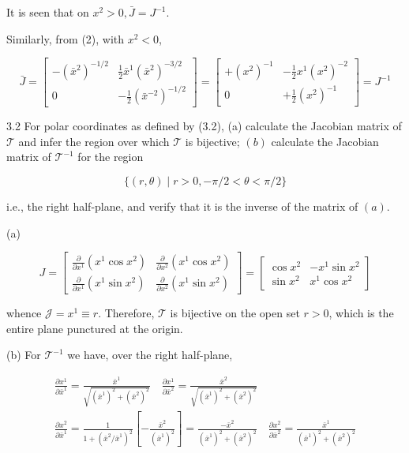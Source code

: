 \documentclass[10pt]{article}
\begin{document}
It is seen that on $x^{2}>0, \bar{J}=J^{-1}$.

Similarly, from (2), with $x^{2}<0$,

$$
\bar{J}=\left[\begin{array}{cc}
-\left(\bar{x}^{2}\right)^{-1 / 2} & \frac{1}{2} \bar{x}^{1}\left(\bar{x}^{2}\right)^{-3 / 2} \\
0 & -\frac{1}{2}\left(\bar{x}^{-2}\right)^{-1 / 2}
\end{array}\right]=\left[\begin{array}{cc}
+\left(x^{2}\right)^{-1} & -\frac{1}{2} x^{1}\left(x^{2}\right)^{-2} \\
0 & +\frac{1}{2}\left(x^{2}\right)^{-1}
\end{array}\right]=J^{-1}
$$

3.2 For polar coordinates as defined by (3.2), (a) calculate the Jacobian matrix of $\mathscr{T}$ and infer the region over which $\mathscr{T}$ is bijective; $(b)$ calculate the Jacobian matrix of $\mathscr{T}^{-1}$ for the region

$$
\{(r, \theta) \mid r>0,-\pi / 2<\theta<\pi / 2\}
$$

i.e., the right half-plane, and verify that it is the inverse of the matrix of $(a)$.

(a)

$$
J=\left[\begin{array}{cc}
\frac{\partial}{\partial x^{1}}\left(x^{1} \cos x^{2}\right) & \frac{\partial}{\partial x^{2}}\left(x^{1} \cos x^{2}\right) \\
\frac{\partial}{\partial x^{1}}\left(x^{1} \sin x^{2}\right) & \frac{\partial}{\partial x^{2}}\left(x^{1} \sin x^{2}\right)
\end{array}\right]=\left[\begin{array}{ll}
\cos x^{2} & -x^{1} \sin x^{2} \\
\sin x^{2} & x^{1} \cos x^{2}
\end{array}\right]
$$

whence $\mathscr{J}=x^{1} \equiv r$. Therefore, $\mathscr{T}$ is bijective on the open set $r>0$, which is the entire plane punctured at the origin.

(b) For $\mathscr{T}^{-1}$ we have, over the right half-plane,

$$
\begin{gathered}
\frac{\partial x^{1}}{\partial \bar{x}^{1}}=\frac{\bar{x}^{1}}{\sqrt{\left(\bar{x}^{1}\right)^{2}+\left(\bar{x}^{2}\right)^{2}}} \quad \frac{\partial x^{1}}{\partial \bar{x}^{2}}=\frac{\bar{x}^{2}}{\sqrt{\left(\bar{x}^{1}\right)^{2}+\left(\bar{x}^{2}\right)^{2}}} \\
\frac{\partial x^{2}}{\partial \bar{x}^{1}}=\frac{1}{1+\left(\bar{x}^{2} / \bar{x}^{1}\right)^{2}}\left[-\frac{\bar{x}^{2}}{\left(\bar{x}^{1}\right)^{2}}\right]=\frac{-\bar{x}^{2}}{\left(\bar{x}^{1}\right)^{2}+\left(\bar{x}^{2}\right)^{2}} \quad \frac{\partial x^{2}}{\partial \bar{x}^{2}}=\frac{\bar{x}^{1}}{\left(\bar{x}^{1}\right)^{2}+\left(\bar{x}^{2}\right)^{2}}
\end{gathered}
$$
\end{document}
